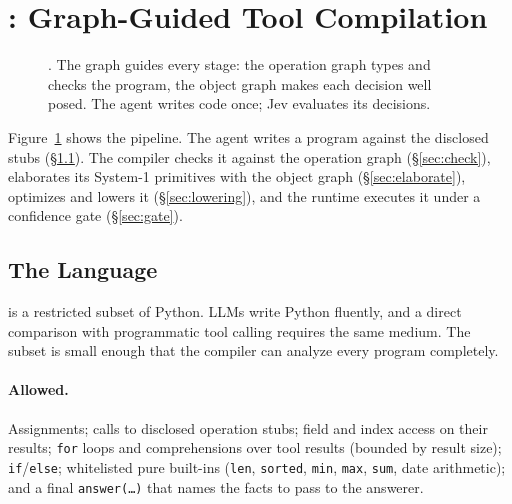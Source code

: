 \section{\jif: Graph-Guided Tool Compilation}
\label{sec:compiler}

\begin{figure}[t]
  \centering
  \caption{\jif. The graph guides every stage: the operation graph types and checks the program, the object graph makes each decision well posed. The agent writes code once; Jev evaluates its decisions.}
  \label{fig:overview}
\end{figure}

Figure~\ref{fig:overview} shows the pipeline. The agent writes a \pyif program against the disclosed stubs (\S\ref{sec:lang}). The compiler checks it against the operation graph (\S\ref{sec:check}), elaborates its System-1 primitives with the object graph (\S\ref{sec:elaborate}), optimizes and lowers it (\S\ref{sec:lowering}), and the runtime executes it under a confidence gate (\S\ref{sec:gate}).

\subsection{The \pyif Language}
\label{sec:lang}
\pyif is a restricted subset of Python. LLMs write Python fluently, and a direct comparison with programmatic tool calling requires the same medium. The subset is small enough that the compiler can analyze every program completely.

\paragraph{Allowed.} Assignments; calls to disclosed operation stubs; field and index access on their results; \texttt{for} loops and comprehensions over tool results (bounded by result size); \texttt{if}/\texttt{else}; whitelisted pure built-ins (\texttt{len}, \texttt{sorted}, \texttt{min}, \texttt{max}, \texttt{sum}, date arithmetic); and a final \texttt{answer(\ldots)} that names the facts to pass to the answerer.

